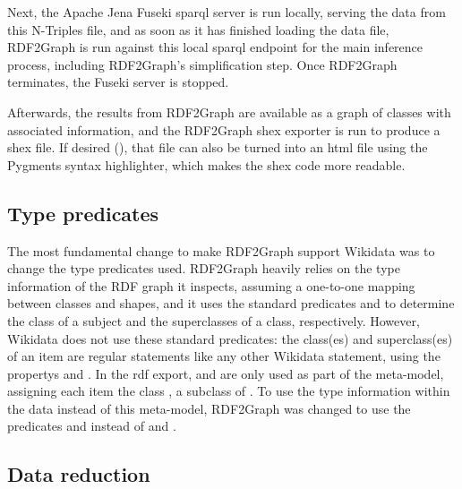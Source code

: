 Next, the Apache Jena Fuseki \gls{sparql} server is run locally,
serving the data from this \gls{N-Triples} file,
and as soon as it has finished loading the data file,
\gls{RDF2Graph} is run against this local \gls{sparql} endpoint for the main inference process,
including \gls{RDF2Graph}’s simplification step.
Once \gls{RDF2Graph} terminates, the Fuseki server is stopped.

Afterwards, the results from \gls{RDF2Graph} are available as a graph of classes with associated information,
and the \gls{RDF2Graph} \gls{shex} exporter is run to produce a \gls{shex} file.
If desired (),
that file can also be turned into an \gls{html} file using the Pygments syntax highlighter,
which makes the \gls{shex} code more readable.


\subsection{Type predicates}
\label{subsec:RDF2Graph+Wikidata:Wikidata:predicates}

The most fundamental change to make \gls{RDF2Graph} support \gls{Wikidata}
was %
to change the type predicates used.
\Gls{RDF2Graph} heavily relies on the type information of the RDF graph it inspects,
assuming a one-to-one mapping between classes and \glspl{shape},
and it uses the standard \glspl{predicate}  and 
to determine the class of a subject and the superclasses of a class, respectively.
However, \gls{Wikidata} does not use these standard \glspl{predicate}:
the class(es) and superclass(es) of an item
are regular \glspl{statement} like any other \gls{Wikidata} \gls{statement},
using the \glspl{property}  and .
In the \gls{rdf} export,  and  are only used
as part of the meta-model, %
assigning each item the class , a subclass of .
To use the type information within the data instead of this meta-model,
\gls{RDF2Graph} was changed to use the \glspl{predicate}  and 
instead of  and .

\subsection{Data reduction}
\label{subsec:RDF2Graph+Wikidata:Wikidata:reduction}

